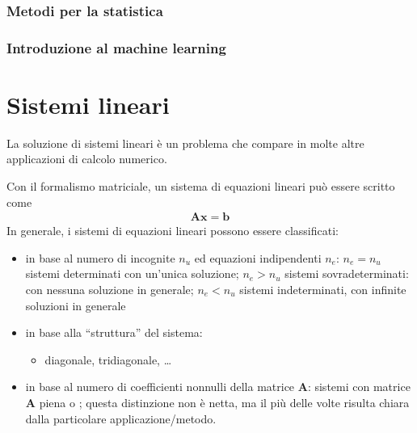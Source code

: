 \documentclass[letterpaper,10pt,english]{jupyterBook}
\begin{document}
\subsubsection*{Metodi per la statistica}
\subsubsection*{Introduzione al machine learning}

\sphinxstepscope


\section{Sistemi lineari}
\label{\detokenize{ch/numerics/linear:sistemi-lineari}}\label{\detokenize{ch/numerics/linear::doc}}
\sphinxAtStartPar
La soluzione di sistemi lineari è un problema che compare in molte altre applicazioni di calcolo numerico.



\sphinxAtStartPar
{} Con il formalismo matriciale, un sistema di equazioni lineari può essere scritto come
\begin{equation*}
\begin{split}\mathbf{A} \mathbf{x} = \mathbf{b}\end{split}
\end{equation*}
\sphinxAtStartPar
{} In generale, i sistemi di equazioni lineari possono essere classificati:
\begin{itemize}
\item {} 
\sphinxAtStartPar
in base al numero di incognite \(n_u\) ed equazioni indipendenti \(n_e\): \(n_e = n_u\) sistemi determinati con un’unica soluzione; \(n_e > n_u\) sistemi sovradeterminati: con nessuna soluzione in generale; \(n_e < n_u\) sistemi indeterminati, con infinite soluzioni in generale

\item {} 
\sphinxAtStartPar
in base alla “struttura” del sistema:
\begin{itemize}
\item {} 
\sphinxAtStartPar
diagonale, tridiagonale, …

\end{itemize}

\item {} 
\sphinxAtStartPar
in base al numero di coefficienti non\sphinxhyphen{}nulli della matrice \(\mathbf{A}\): sistemi con matrice \(\mathbf{A}\) piena o ; questa distinzione non è netta, ma il più delle volte risulta chiara dalla particolare applicazione/metodo.

\end{itemize}
\end{document}
